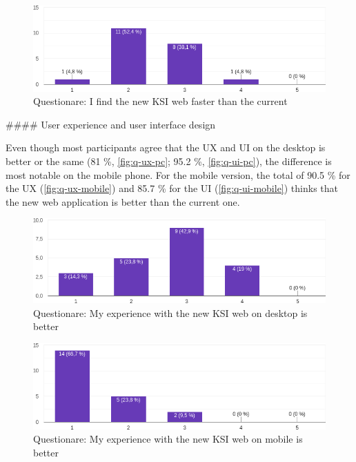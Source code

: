 \documentclass[
  digital, %
  oneside, %
  lof,     %
  nolot,     %
]{fithesis4}
\begin{document}
{\begin{figure}
\includegraphics[width=\textwidth]{assets/img/questionare/faster}
\caption{Questionare: I find the new KSI web faster than the current}
\label{fig:q-speed}
\end{figure}


#### User experience and user interface design

Even though most participants agree that the UX and UI on the desktop is better or the same (81 \%, \autoref{fig:q-ux-pc}; 95.2 \%, \autoref{fig:q-ui-pc}), the difference is most notable on the mobile phone. For the mobile version, the total of 90.5 \% for the UX (\autoref{fig:q-ux-mobile}) and  85.7 \% for the UI (\autoref{fig:q-ui-mobile}) thinks that the new web application is better than the current one.

\begin{figure}
\includegraphics[width=\textwidth]{assets/img/questionare/pc-ux}
\caption{Questionare: My experience with the new KSI web on desktop is better}
\label{fig:q-ux-pc}
\end{figure}

\begin{figure}
\includegraphics[width=\textwidth]{assets/img/questionare/mobile-ux}
\caption{Questionare: My experience with the new KSI web on mobile is better}
\label{fig:q-ux-mobile}
\end{figure}

}
\end{document}
